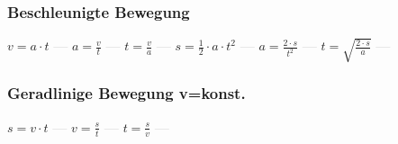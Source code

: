\subsubsection{Beschleunigte Bewegung} 
\begin{minipage}{0.45\textwidth} 
\end{minipage} 
\begin{minipage}{0.45\textwidth} 
 
\end{minipage} 
$ v = a\cdot t $ \textcolor{lightgray}{\textbf{---}} 
$ a = \frac{v}{t} $ \textcolor{lightgray}{\textbf{---}} 
$ t = \frac{v}{a} $ \textcolor{lightgray}{\textbf{---}} 
$ s = \frac{1}{2}\cdot a\cdot t^{2} $ \textcolor{lightgray}{\textbf{---}} 
$ a = \frac{2\cdot s}{t^{2} } $ \textcolor{lightgray}{\textbf{---}} 
$ t = \sqrt{\frac{2\cdot s}{a}} $ \textcolor{lightgray}{\textbf{---}} 

\subsubsection{Geradlinige Bewegung v=konst.} 
\begin{minipage}{0.45\textwidth} 
\end{minipage} 
\begin{minipage}{0.45\textwidth} 
 
\end{minipage} 
$ s = v\cdot t $ \textcolor{lightgray}{\textbf{---}} 
$ v = \frac{s}{t} $ \textcolor{lightgray}{\textbf{---}} 
$ t = \frac{s}{v} $ \textcolor{lightgray}{\textbf{---}} 

